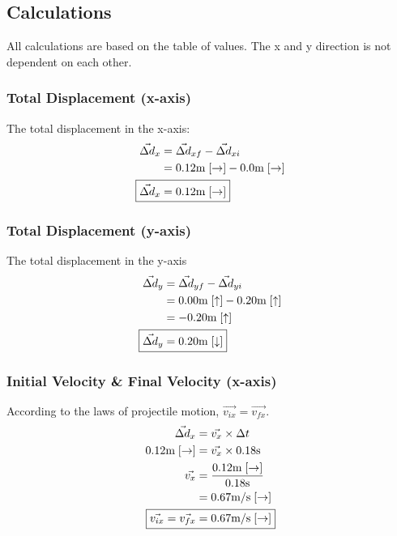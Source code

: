\documentclass[a4paper,12pt]{article}
\begin{document}
	\newpage
	
	\subsection{Calculations}
	All calculations are based on the table of values. The x and y direction is not dependent on each other. 
	\subsubsection{Total Displacement (x-axis)}
	The total displacement in the x-axis:
	\begin{align*}
		\vec{\Delta d}_x&=\vec{\Delta d}_{xf}-\vec{\Delta d}_{xi}\\
		&=0.12 \text{m}\;[\rightarrow]-0.0 \text{m}\; [\rightarrow]\\
		\Aboxed{\vec{\Delta d}_x&=0.12\text{m}\; [\rightarrow]}
	\end{align*}
	\subsubsection{Total Displacement (y-axis)}
	The total displacement in the y-axis
	\begin{align*}
		\vec{\Delta d}_y&=\vec{\Delta d}_{yf}-\vec{\Delta d}_{yi}\\
		&=0.00 \text{m}\; [\uparrow]-0.20 \text{m}\; [\uparrow]\\
		&=-0.20\text{m}\; [\uparrow]\\
		\Aboxed{\vec{\Delta d}_y&=0.20\text{m}\; [\downarrow]}
	\end{align*}
	\subsubsection{Initial Velocity \& Final Velocity (x-axis)}
	According to the laws of projectile motion, $\vec{v_{ix}}=\vec{v_{fx}}$.
	\begin{align*}
		\vec{\Delta d}_x&=\vec{v_x}\times \Delta t\\
		0.12\text{m}\; [\rightarrow]&=\vec{v_x} \times 0.18\text{s}\\
		\vec{v_x}&=\frac{0.12\text{m}\; [\rightarrow]}{0.18\text{s}}\\
		      &=0.67\text{m}/\text{s}\;[\rightarrow]\\
		\Aboxed{\vec{v_{ix}}=\vec{v_{fx}}&=0.67\text{m}/\text{s}\;[\rightarrow]}
	\end{align*}
\end{document}
